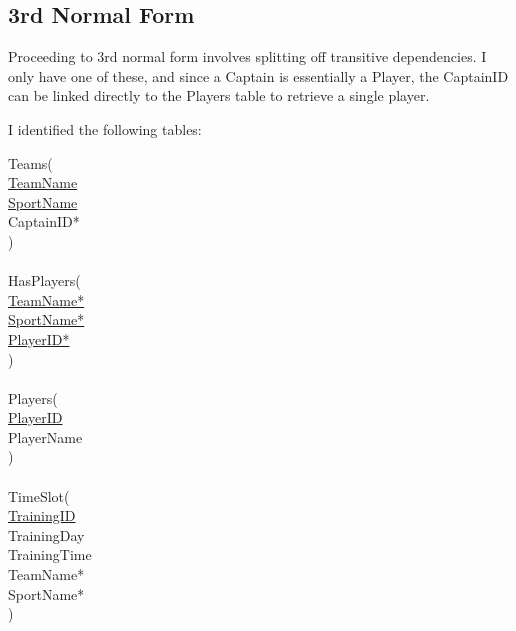 \documentclass[11pt, article]{article}
\begin{document}
\newpage
\subsection{3rd Normal Form}

Proceeding to 3rd normal form involves splitting off transitive dependencies. I only have one of these, and since a Captain is essentially a Player, the CaptainID can be linked directly to the Players table to retrieve a single player. 

I identified the following tables:

\begin{tabbing}
Teams( \newline \\
	\hspace{5mm}  \underline{TeamName}\\
	\hspace{5mm} \underline{SportName} \\
	\hspace{5mm} CaptainID*                     \\
)\\
\\
HasPlayers(\\
	\hspace{5mm}  \underline{TeamName*}\\
	\hspace{5mm} \underline{SportName*} \\
	\hspace{5mm}  \underline{PlayerID*}\\
)\\
\\
	
Players( \newline \\
	\hspace{5mm}  \underline{PlayerID}\\
	\hspace{5mm} PlayerName                      \\
)\\
\\
TimeSlot( \newline \\
	\hspace{5mm}  \underline{TrainingID}\\
	\hspace{5mm} TrainingDay                     \\
	\hspace{5mm} TrainingTime \\
	\hspace{5mm}  TeamName*\\
	\hspace{5mm} SportName* \\
)\\

\end{tabbing}
\end{document}
